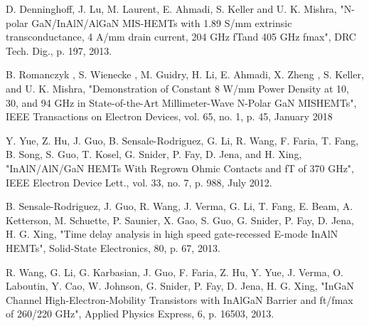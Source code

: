 \documentclass[journal]{IEEEtran}
\begin{document}
\begin{thebibliography}{00}
 D. Denninghoff, J. Lu, M. Laurent, E. Ahmadi, S. Keller and U. K. Mishra, "N-polar GaN/InAlN/AlGaN MIS-HEMTs with 1.89 S/mm extrinsic transconductance, 4 A/mm drain current, 204 GHz fTand 405 GHz fmax", DRC Tech. Dig., p. 197, 2013.

 B. Romanczyk , S. Wienecke , M. Guidry, H. Li, E. Ahmadi, X. Zheng , S. Keller, and U. K. Mishra, "Demonstration of Constant 8 W/mm Power Density at 10, 30, and 94 GHz in State-of-the-Art Millimeter-Wave N-Polar GaN MISHEMTs", IEEE Transactions on Electron Devices, vol. 65, no. 1, p. 45,  January 2018

 Y. Yue, Z. Hu, J. Guo, B. Sensale-Rodriguez, G. Li, R. Wang, F. Faria, T. Fang, B. Song, S. Guo, T. Kosel, G. Snider, P. Fay, D. Jena, and H. Xing, "InAlN/AlN/GaN HEMTs With Regrown Ohmic Contacts and fT of 370 GHz", IEEE Electron Device Lett., vol. 33, no. 7, p. 988, July 2012.

 B. Sensale-Rodriguez, J. Guo, R. Wang, J. Verma, G. Li, T. Fang, E. Beam, A. Ketterson, M. Schuette, P. Saunier, X. Gao, S. Guo, G. Snider, P. Fay, D. Jena, H. G. Xing, "Time delay analysis in high speed gate-recessed E-mode InAlN HEMTs", Solid-State Electronics, 80, p. 67, 2013.

 R. Wang, G. Li, G. Karbasian, J. Guo, F. Faria, Z. Hu, Y. Yue, J. Verma, O. Laboutin, Y. Cao, W. Johnson, G. Snider, P. Fay, D. Jena, H. G. Xing, "InGaN Channel High-Electron-Mobility Transistors with InAlGaN Barrier and ft/fmax of 260/220 GHz", Applied Physics Express, 6, p. 16503, 2013.

\end{thebibliography}
\end{document}
